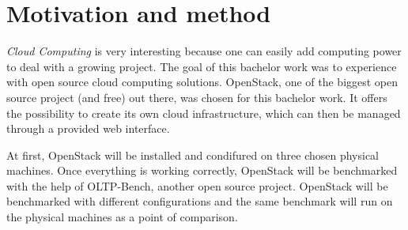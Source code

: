 \section{Motivation and method}
\textit{Cloud Computing} is very interesting because one can easily add computing power to deal with a growing project. 
The goal of this bachelor work was to experience with open source cloud computing solutions. 
OpenStack, one of the biggest open source project (and free) out there, was chosen for this bachelor work. 
It offers the possibility to create its own cloud infrastructure, which can then be managed through a provided web interface.

At first, OpenStack will be installed and condifured on three chosen physical machines. 
Once everything is working correctly, OpenStack will be benchmarked with the help of OLTP-Bench, another open source project. 
OpenStack will be benchmarked with different configurations and the same benchmark will run on the physical machines as a point of comparison.


